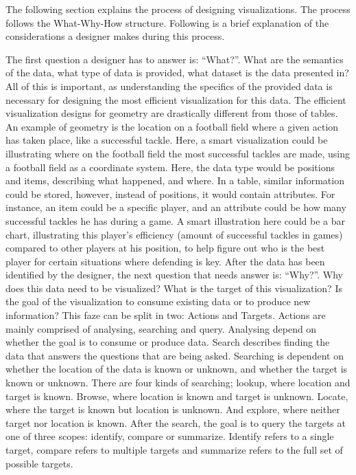 \documentclass[Report.tex]{subfiles}
\begin{document}
The following section explains the process of designing visualizations. The process follows the What-Why-How structure. Following is a brief explanation of the considerations a designer makes during this process.

The first question a designer has to answer is: “What?”. What are the semantics of the data, what type of data is provided, what dataset is the data presented in? All of this is important, as understanding the specifics of the provided data is necessary for designing the most efficient visualization for this data. The efficient visualization designs for geometry are drastically different from those of tables. An example of geometry is the location on a football field where a given action has taken place, like a successful tackle. Here, a smart visualization could be illustrating where on the football field the most successful tackles are made, using a football field as a coordinate system. Here, the data type would be positions and items, describing what happened, and where. In a table, similar information could be stored, however, instead of positions, it would contain attributes. For instance, an item could be a specific player, and an attribute could be how many successful tackles he has during a game. A smart illustration here could be a bar chart, illustrating this player’s efficiency (amount of successful tackles in games) compared to other players at his position, to help figure out who is the best player for certain situations where defending is key.
After the data has been identified by the designer, the next question that needs answer is: “Why?”. Why does this data need to be visualized? What is the target of this visualization? Is the goal of the visualization to consume existing data or to produce new information? This faze can be split in two: Actions and Targets. Actions are mainly comprised of analysing, searching and query. Analysing depend on whether the goal is to consume or produce data. Search describes finding the data that answers the questions that are being asked. Searching is dependent on whether the location of the data is known or unknown, and whether the target is known or unknown. There are four kinds of searching; lookup, where location and target is known. Browse, where location is known and target is unknown. Locate, where the target is known but location is unknown. And explore, where neither target nor location is known. After the search, the goal is to query the targets at one of three scopes: identify, compare or summarize. Identify refers to a single target, compare refers to multiple targets and summarize refers to the full set of possible targets.
\end{document}

